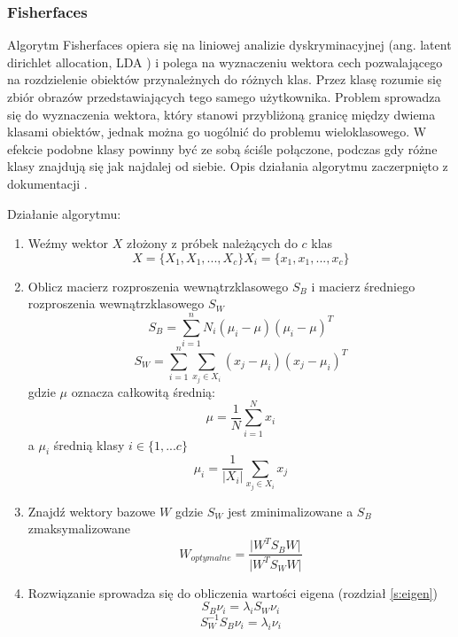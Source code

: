 \subsubsection{Fisherfaces} \label{fisher}
Algorytm Fisherfaces \cite{opencv_doc} opiera się na liniowej analizie dyskryminacyjnej (ang. latent dirichlet allocation, LDA \cite{pca_lda}) i polega na wyznaczeniu wektora cech pozwalającego na rozdzielenie obiektów przynależnych do różnych klas. Przez klasę rozumie się zbiór obrazów przedstawiających tego samego użytkownika. Problem sprowadza się do wyznaczenia wektora, który stanowi przybliżoną granicę między dwiema klasami obiektów, jednak można go uogólnić do problemu wieloklasowego. W efekcie podobne klasy powinny być ze sobą ściśle połączone, podczas gdy różne klasy znajdują się jak najdalej od siebie. Opis działania algorytmu zaczerpnięto z dokumentacji \cite{opencv_doc}.

Działanie algorytmu:
\begin{enumerate}
\item Weźmy wektor $X$ złożony z próbek należących do $c$ klas
\begin{equation}
X=\{X_{1},X_{1},...,X_{c}\}
X_{i}=\{x_{1},x_{1},...,x_{c}\}
\end{equation}
\item Oblicz macierz rozproszenia wewnątrzklasowego $S_{B}$ i macierz średniego rozproszenia wewnątrzklasowego $S_{W}$
\begin{equation}
S_{B}=\sum_{i=1}^{n}N_{i}(\mu_{i}-\mu)(\mu_{i}-\mu)^{T}
\end{equation}
\begin{equation}
S_{W}=\sum_{i=1}^{n}\sum_{x_{j}\in X_{i}}(x_{j}-\mu_{i})(x_{j}-\mu_{i})^{T}
\end{equation}
gdzie $\mu$ oznacza całkowitą średnią:
\begin{equation}
\mu=\frac{1}{N}\sum_{i=1}^{N}x_{i}
\end{equation}
a $\mu_{i}$ średnią klasy $i\in \{1,...c\}$
\begin{equation}
\mu_{i}=\frac{1}{|X_{i}|}\sum_{x_{j}\in X_{i}}x_{j}
\end{equation}
\item Znajdź wektory bazowe $W$ gdzie $S_{W}$ jest zminimalizowane a $S_{B}$ zmaksymalizowane
\begin{equation}
W_{optymalne}=\frac{\vert W^{T}S_{B}W\vert }{\vert W^{T}S_{W}W\vert }
\end{equation}
\item Rozwiązanie sprowadza się do obliczenia wartości eigena (rozdział \ref{s:eigen})
\begin{equation}
S_{B}\nu_{i}=\lambda_{i}S_{W}\nu_{i}
\end{equation}
\begin{equation}
S_{W}^{-1}S_{B}\nu_{i}=\lambda_{i}\nu_{i}
\end{equation}
\end{enumerate}

